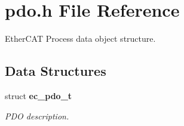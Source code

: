 \section{pdo.\-h File Reference}
\label{pdo_8h}


Ether\-C\-A\-T Process data object structure.  


\subsection*{Data Structures}
\begin{DoxyCompactItemize}
\item 
struct {\bf ec\-\_\-pdo\-\_\-t}
\begin{DoxyCompactList}\small\item\em P\-D\-O description. \end{DoxyCompactList}\end{DoxyCompactItemize}
